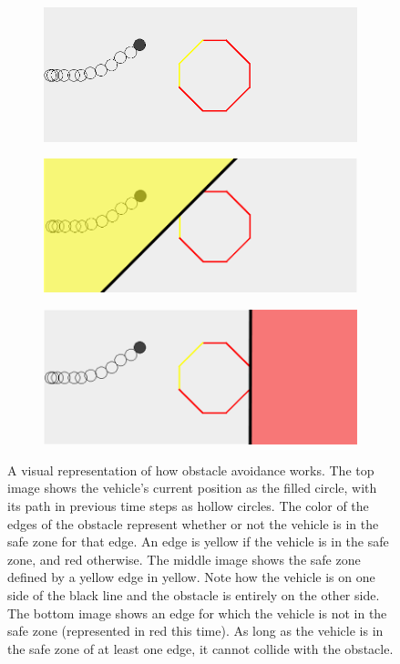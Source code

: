 \begin{figure}[!t]
    \centering
    
    \begin{subfigure}[t]{0.47\textwidth}
        \includegraphics[width=\textwidth]{img/obs1}
        \caption{}
    \end{subfigure}
    \hfil
    \begin{subfigure}[t]{0.47\textwidth}
        \includegraphics[width=\textwidth]{img/obs2}
        \caption{}
    \end{subfigure}
    \par\bigskip
    \begin{subfigure}[t]{0.47\textwidth}
        \includegraphics[width=\textwidth]{img/obs3}
        \caption{}
    \end{subfigure}
    \caption{A visual representation of how obstacle avoidance works. The top image shows the vehicle's current position as the filled circle, with its path in previous time steps as hollow circles. The color of the edges of the obstacle represent whether or not the vehicle is in the safe zone for that edge. An edge is yellow if the vehicle is in the safe zone, and red otherwise. The middle image shows the safe zone defined by a yellow edge in yellow. Note how the vehicle is on one side of the black line and the obstacle is entirely on the other side. The bottom image shows an edge for which the vehicle is not in the safe zone (represented in red this time). As long as the vehicle is in the safe zone of at least one edge, it cannot collide with the obstacle.}\label{fig:obs}
\end{figure}
